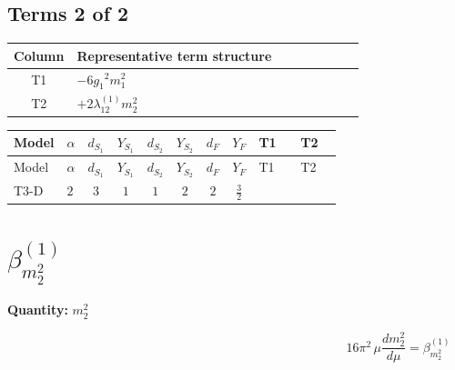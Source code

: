 \documentclass[8pt]{article}
\begin{document}
\begin{landscape}
\subsection*{Terms 2 of 2}
\begin{center}
\begin{tabular}{@{}c >{\raggedright\arraybackslash}p{0.82\linewidth}@{}}
\toprule
Column & Representative term structure \\
\midrule
T1 & \(\displaystyle -6 {g_1}^2 {m_1^2}\) \\
\midrule
T2 & \(\displaystyle +2 {\lambda_{12}^{(1)}} {m_2^2}\) \\
\midrule
\bottomrule
\end{tabular}
\end{center}
\smallskip
\tiny
\begin{longtable}{@{}llcccccc >{\raggedright\arraybackslash}p{0.21\linewidth} >{\raggedright\arraybackslash}p{0.21\linewidth}@{}}
\toprule
Model & $\alpha$ & $d_{S_1}$ & $Y_{S_1}$ & $d_{S_2}$ & $Y_{S_2}$ & $d_F$ & $Y_F$ & T1 & T2 \\
\midrule
\endfirsthead
\toprule
Model & $\alpha$ & $d_{S_1}$ & $Y_{S_1}$ & $d_{S_2}$ & $Y_{S_2}$ & $d_F$ & $Y_F$ & T1 & T2 \\
\midrule
\endhead
T3-D & $2$ & $3$ & $1$ & $1$ & $2$ & $2$ & $\frac{3}{2}$ & \scriptsize\adjustbox{max width=\linewidth}{$\begin{gathered} -6 {g_1}^2 {m_1^2}\end{gathered}$} & \scriptsize\adjustbox{max width=\linewidth}{$\begin{gathered} +2 {\lambda_{12}^{(1)}} {m_2^2}\end{gathered}$} \\
\midrule
\bottomrule
\end{longtable}
\clearpage
\section*{$\beta_{m_2^2}^{(1)}$}
\noindent\textbf{Quantity: }$m_2^2$\par\smallskip
\[16\pi^2\,\mu\frac{d m_2^2}{d\mu}=\beta_{m_2^2}^{(1)}\]

\end{landscape}
\end{document}
